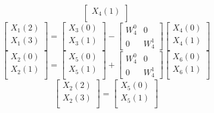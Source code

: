 \documentclass[journal,12pt,twocolumn]{IEEEtran}
\renewcommand\thesection{\arabic{section}}
\begin{document}
\begin{enumerate}[label=\arabic*.,ref=\thesection.\theenumi]
\begin{equation}
\begin{bmatrix}
			X_{4}(1) \\ 
		\end{bmatrix}
	\end{equation}
	\begin{equation}
		\begin{bmatrix}
			X_{1}(2) \\ 
			X_{1}(3)\\ 
		\end{bmatrix}
		=
		\begin{bmatrix}
			X_{3}(0) \\ 
			X_{3}(1)\\ 
		\end{bmatrix}
		-
		\begin{bmatrix}
			W^{0}_{4} & 0\\
			0 & W^{1}_{4}
		\end{bmatrix}
		\begin{bmatrix}
			X_{4}(0) \\ 
			X_{4}(1) \\ 
		\end{bmatrix}
	\end{equation}
	\begin{equation}
		\begin{bmatrix}
			X_{2}(0) \\ 
			X_{2}(1)\\ 
		\end{bmatrix}
		=
		\begin{bmatrix}
			X_{5}(0) \\ 
			X_{5}(1)\\ 
		\end{bmatrix}
		+
		\begin{bmatrix}
			W^{0}_{4} & 0\\
			0 & W^{1}_{4}
		\end{bmatrix}
		\begin{bmatrix}
			X_{6}(0) \\ 
			X_{6}(1) \\ 
		\end{bmatrix}
	\end{equation}
	\begin{equation}
		\begin{bmatrix}
			X_{2}(2) \\ 
			X_{2}(3)\\ 
		\end{bmatrix}
		=
		\begin{bmatrix}
			X_{5}(0) \\ 
			X_{5}(1)\\ 

\end{bmatrix}
\end{equation}
\end{enumerate}
\end{document}
